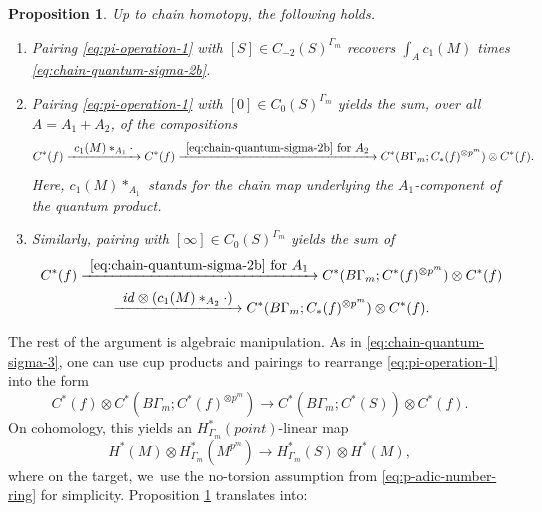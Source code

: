\documentclass[10pt,a4paper]{amsart}
\newcommand\To[1]{\mathchoice{\xrightarrow{\textstyle\kern4pt#1\kern3pt}}{\stackrel{#1}{\longrightarrow}}{}{}}
\theoremstyle{plain}
\newtheorem{proposition}[theorem]{Proposition}
\theoremstyle{definition}
\begin{document}
\begin{proposition} \label{th:extra-point}
Up to chain homotopy, the following holds.
\begin{enumerate}
\item
Pairing \eqref{eq:pi-operation-1} with $[S] \in C_{-2}(S)^{\Gamma_m}$ recovers $\int_A c_1(M)$ times \eqref{eq:chain-quantum-sigma-2b}.

\item
Pairing \eqref{eq:pi-operation-1} with $[0] \in C_0(S)^{\Gamma_m}$ yields the sum, over all $A = A_1+A_2$, of the compositions
\begin{equation*}
C^*(f) \To{c_1(M) \ast_{A_1} \cdot} C^*(f) \To{\text{\eqref{eq:chain-quantum-sigma-2b} for } A_2} C^*(B\Gamma_m;C_*(f)^{\otimes p^m}) \otimes C^*(f).
\end{equation*}
Here, $c_1(M) \ast_{A_1}$ stands for the chain map underlying the $A_1$-component of the quantum product.

\item
Similarly, pairing with $[\infty] \in C_0(S)^{\Gamma_m}$ yields the sum of
\begin{multline*}
C^*(f) \To{\text{\eqref{eq:chain-quantum-sigma-2b} for } A_1} C^*(B\Gamma_m;C^*(f)^{\otimes p^m}) \otimes C^*(f)
\\
\To{\mathit{id} \otimes (c_1(M) \ast_{A_2} \cdot)}
C^*(B\Gamma_m;C_*(f)^{\otimes p^m}) \otimes C^*(f).
\end{multline*}
\end{enumerate}
\end{proposition}

The rest of the argument is algebraic manipulation. As in \eqref{eq:chain-quantum-sigma-3}, one can use cup products and pairings to rearrange \eqref{eq:pi-operation-1} into the form
\begin{equation*}
C^*(f) \otimes C^*(B\Gamma_m; C^*(f)^{\otimes p^m}) \to
C^*(B\Gamma_m; C^*(S)) \otimes C^*(f).
\end{equation*}
On cohomology, this yields an $H^*_{\Gamma_m}(\mathit{point})$-linear map
\begin{equation}\label{eq:pi-operation-3}
H^*(M) \otimes H^*_{\Gamma_m}(M^{p^m}) \to H^*_{\Gamma_m}(S) \otimes H^*(M),
\end{equation}
where on the target, we~use the no-torsion assumption from \eqref{eq:p-adic-number-ring} for simplicity. Proposition \ref{th:extra-point} translates into:
\end{document}
